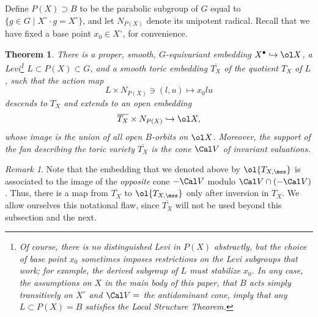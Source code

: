 \documentclass[final]{amsart}
\newtheorem{thm}[subsubsection]{Theorem}
\theoremstyle{remark}
\newtheorem{rem}[subsubsection]{Remark}
\theoremstyle{definition}
\numberwithin{equation}{section}
\begin{document}
Define $P(X) \supset B$ to be the parabolic subgroup of $G$ equal to 
$\{ g \in G \mid X^\circ \cdot g = X^\circ \}$, and let $N_{P(X)}$ denote its unipotent radical. Recall that we have fixed a base point $x_0\in X^\circ$, for convenience.

\begin{thm}\label{thm:localstructure}
 There is a proper, smooth, $G$-equivariant embedding $X^\bullet \hookrightarrow \ol X$, a Levi\footnote{Of course, there is no distinguished Levi in $P(X)$ abstractly, but the choice of base point $x_0$ sometimes imposes restrictions on the Levi subgroups that work; for example, the derived subgroup of $L$ must stabilize $x_0$. In any case, the assumptions on $X$ in the main body of this paper, that $B$ acts simply transitively on $X^\circ$ and $\Cal V=$ the antidominant cone, imply that any $L\subset P(X)= B$ satisfies the Local Structure Theorem.} $L \subset P(X) \subset G$,  and a smooth toric embedding $\overline{T_X}$ of the quotient $T_X$ of $L$, such that the action map 
 \[ L \times N_{P(X)} \ni (l, u) \mapsto x_0 lu\]
 descends to $T_X$ and extends to an open embedding
 \[ \overline{T_X} \times N_{P(X)} \hookrightarrow \ol X,\]
 whose image is the union of all open $B$-orbits on $\ol X$. Moreover, the support of the fan describing the toric variety $\overline{T_X}$ is the cone $\Cal V$ of invariant valuations.
\end{thm}

\begin{rem}
 Note that the embedding that we denoted above by $\ol{T_{X,\mss}}$ is associated to the image of the \emph{opposite} cone $-\Cal V$ modulo $\Cal V\cap (-\Cal V)$. Thus, there is a map from $\overline{T_X}$ to $\ol{T_{X,\mss}}$ only after inversion in $T_X$. We allow ourselves this notational flaw, since $\overline{T_X}$ will not be used beyond this subsection and the next.
\end{rem}
\end{document}
